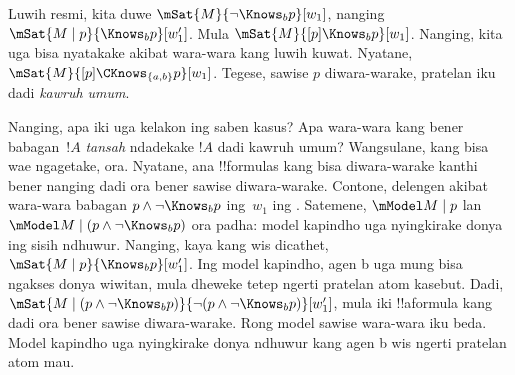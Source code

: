 \documentclass[../../../include/open-logic-section]{subfiles}
\begin{document}
Luwih resmi, kita duwe $\mSat{M}{\lnot \Knows_b p}[w_1]$, nanging
$\mSat{M
\mid p}{\Knows_b p}[w'_1]$. Mula $\mSat{M}{[p] \Knows_b
p}[w_1]$. Nanging, kita uga bisa nyatakake akibat wara-wara kang
luwih kuwat. Nyatane,
$\mSat{M}{[p]\CKnows_{\{a,b\}} p}[w_1]$. Tegese, sawise $p$
diwara-warake, pratelan iku dadi \emph{kawruh umum}.

Nanging, apa iki uga kelakon ing saben kasus? Apa wara-wara kang bener
babagan~$!A$ \emph{tansah} ndadekake $!A$ dadi kawruh umum? Wangsulane,
kang bisa wae ngagetake, ora. Nyatane, ana !!{formula}s kang bisa
diwara-warake kanthi bener nanging dadi ora bener sawise diwara-warake.
Contone, delengen akibat wara-wara babagan $p \land \lnot \Knows_b p$
ing~$w_1$ ing . Satemene,
$\mModel M \mid p$ lan $\mModel M \mid (p \land \lnot \Knows_b p)$
ora padha: model kapindho uga nyingkirake donya ing sisih ndhuwur.
Nanging, kaya kang wis dicathet, $\mSat{M \mid p}{\Knows_b
p}[w'_1]$. Ing model kapindho, agen b uga mung bisa ngakses donya
wiwitan, mula dheweke tetep ngerti pratelan atom kasebut. Dadi,
$\mSat{M \mid (p \land \lnot \Knows_b p)}{\lnot
(p \land \lnot \Knows_b p)}[w'_1]$, mula iki !!a{formula} kang
dadi ora bener sawise diwara-warake.
Rong model sawise wara-wara iku beda. Model kapindho uga nyingkirake donya ndhuwur kang agen b wis ngerti pratelan atom mau.
\end{document}
